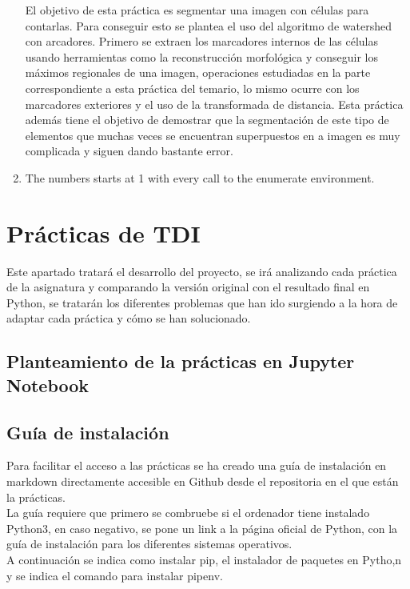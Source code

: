 \documentclass[a4paper,12pt]{report}
\begin{document}
\begin{enumerate}
	El objetivo de esta práctica es segmentar una imagen con células para contarlas. Para conseguir esto se plantea el uso del algoritmo de watershed con arcadores. Primero se extraen los marcadores internos de las células usando herramientas como la reconstrucción morfológica y conseguir los máximos regionales de una imagen, operaciones estudiadas en la parte correspondiente a esta práctica del temario, lo mismo ocurre con los marcadores exteriores y el uso de la transformada de distancia. Esta práctica además tiene el objetivo de demostrar que la segmentación de este tipo de elementos que muchas veces se encuentran superpuestos en a imagen es muy complicada y siguen dando bastante error.
  \item The numbers starts at 1 with every call to the enumerate environment.
\end{enumerate}

\chapter{Prácticas de TDI}

Este apartado tratará el desarrollo del proyecto, se irá analizando cada práctica de la asignatura y comparando la versión original con el resultado final en Python, se tratarán los diferentes problemas que han ido surgiendo a la hora de adaptar cada práctica y cómo se han solucionado.\\
\section{Planteamiento de la prácticas en Jupyter Notebook}
\section{Guía de instalación}

Para facilitar el acceso a las prácticas se ha creado una guía de instalación en markdown directamente accesible en Github desde el repositoria en el que están la prácticas.\\

La guía requiere que primero se combruebe si el ordenador tiene instalado Python3, en caso negativo, se pone un link a la página oficial de Python, con la guía de instalación para los diferentes sistemas operativos.\\

A continuación se indica como instalar pip, el instalador de paquetes en Pytho,n y se indica el comando para instalar pipenv.\\
\end{document}
